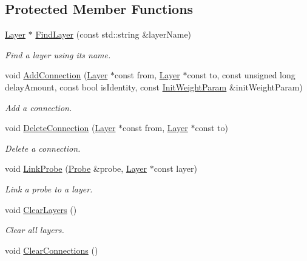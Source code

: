 \subsection*{Protected Member Functions}
\begin{DoxyCompactItemize}
\item 
\hyperlink{classfractal_1_1Layer}{Layer} $\ast$ \hyperlink{classfractal_1_1Rnn_a5b97c7b0db5b405e8e2721155ed0514e}{Find\+Layer} (const std\+::string \&layer\+Name)
\begin{DoxyCompactList}\small\item\em Find a layer using its name. \end{DoxyCompactList}\item 
void \hyperlink{classfractal_1_1Rnn_aab6852a5cb264078d3ea17c264bdd569}{Add\+Connection} (\hyperlink{classfractal_1_1Layer}{Layer} $\ast$const from, \hyperlink{classfractal_1_1Layer}{Layer} $\ast$const to, const unsigned long delay\+Amount, const bool is\+Identity, const \hyperlink{classfractal_1_1InitWeightParam}{Init\+Weight\+Param} \&init\+Weight\+Param)
\begin{DoxyCompactList}\small\item\em Add a connection. \end{DoxyCompactList}\item 
void \hyperlink{classfractal_1_1Rnn_a6962b669f59fced06ce094a6d08cbc4e}{Delete\+Connection} (\hyperlink{classfractal_1_1Layer}{Layer} $\ast$const from, \hyperlink{classfractal_1_1Layer}{Layer} $\ast$const to)
\begin{DoxyCompactList}\small\item\em Delete a connection. \end{DoxyCompactList}\item 
void \hyperlink{classfractal_1_1Rnn_aba2b13c1855723bef6ddfffd7fbc6f04}{Link\+Probe} (\hyperlink{classfractal_1_1Probe}{Probe} \&probe, \hyperlink{classfractal_1_1Layer}{Layer} $\ast$const layer)
\begin{DoxyCompactList}\small\item\em Link a probe to a layer. \end{DoxyCompactList}\item 
void \hyperlink{classfractal_1_1Rnn_a54ec7bf1206c5f9bd634ee1703c859c1}{Clear\+Layers} ()
\begin{DoxyCompactList}\small\item\em Clear all layers. \end{DoxyCompactList}\item 
void \hyperlink{classfractal_1_1Rnn_a961fb4540a58d76b4d9cab51cd5a3ef9}{Clear\+Connections} ()

\end{DoxyCompactItemize}
